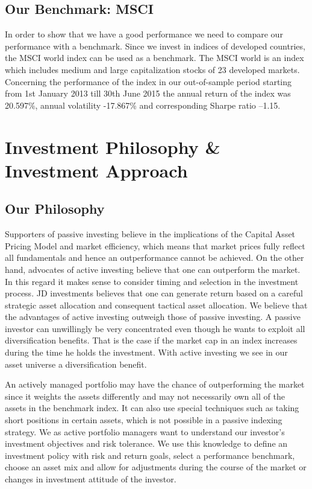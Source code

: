 \documentclass[11pt, parskip=full, DIV=14]{scrreprt}
\begin{document}
\section*{Our Benchmark: MSCI}
In order to show that we have a good performance we need to compare our performance with a benchmark.
Since we invest in indices of developed countries, the MSCI world index can be used as a benchmark.
The MSCI world is an index  which includes medium and large capitalization stocks of 23 developed markets.
Concerning the performance of the index in our out-of-sample period starting from 1st January 2013 till 30th June 2015 the annual return of the index was 20.597\%, annual volatility -17.867\% and corresponding Sharpe ratio –1.15.

\chapter{Investment Philosophy \& Investment Approach}
\section*{Our Philosophy}
Supporters of passive investing believe in the implications of the Capital Asset Pricing Model and market efficiency, which means that market prices fully reflect all fundamentals and hence an outperformance cannot be achieved.
On the other hand, advocates of active investing believe that one can outperform the market.
In this regard it makes sense to consider timing and selection in the investment process.
JD investments believes that one can generate return based on a careful strategic asset allocation and consequent tactical asset allocation.
We believe that the advantages of active investing outweigh those of passive investing.
A passive investor can unwillingly be very concentrated even though he wants to exploit all diversification benefits.
That is the case if the market cap in an index increases during the time he holds the investment.
With active investing we see in our asset universe a diversification benefit.

An actively managed portfolio may have the chance of outperforming the market since it weights the assets differently and may not necessarily own all of the assets in the benchmark index.
It can also use special techniques such as taking short positions in certain assets, which is not possible in a passive indexing strategy.
We as active portfolio managers want to understand our investor’s investment objectives and risk tolerance.
We use this knowledge to define an investment policy with risk and return goals, select a performance benchmark, choose an asset mix and allow for adjustments during the course of the market or changes in investment attitude of the investor.
\end{document}
